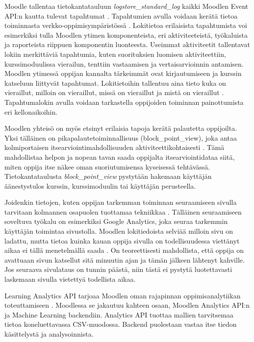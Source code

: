 Moodle tallentaa tietokantatauluun \emph{logstore\_standard\_log} kaikki Moodlen Event API:n kautta tulevat tapahtumat \citep{dougiamasMoodle2022, dougiamasLoggingMoodleDocs2021}. Tapahtumien avulla voidaan kerätä tietoa toiminnasta verkko-oppimisympäristössä \citep{agudo-peregrinaCanWePredict2014}. Lokitietoa erilaisista tapahtumista voi esimerkiksi tulla Moodlen ytimen komponenteista, eri aktiviteeteistä, työkaluista ja raporteista riippuen komponentin luonteesta. Useimmat aktiviteetit tallentavat lokiin merkittäviä tapahtumia, kuten suorituksien luomisen aktiviteettiin, kurssimoduulissa vierailun, tenttiin vastaamisen ja vertaisarvioinnin antamisen. Moodlen ytimessä oppijan kannalta tärkeimmät ovat kirjautumiseen ja kurssin katseluun liittyvät tapahtumat. Lokitietoihin tallentuu aina tieto kuka on vieraillut, milloin on vieraillut, missä on vieraillut ja mistä on vieraillut \citep{abdullahLearningStyleClassification2015}. Tapahtumalokin avulla voidaan tarkastella oppijoiden toiminnan painottumista eri kellonaikoihin.

Moodlen yhteisö on myös etsinyt erilaisia tapoja kerätä palautetta oppijoilta. Yksi tälläinen on pikapalautetoiminnallisuus (block\_point\_view), joka antaa kolmiportaisen itsearviointimahdollisuuden aktiviteettikohtaisesti \citep{fombaronMoodlePluginPoint2021}. Tämä mahdollistaa helpon ja nopean tavan saada oppijalta itsearviointidataa siitä, miten oppija itse näkee oman suoriutumisensa kyseisessä tehtävässä. Tietokantataulusta \emph{block\_point\_view} pystytään hakemaan käyttäjän äänestystulos kurssin, kurssimoduulin tai käyttäjän perusteella.

Joidenkin tietojen, kuten oppijan tarkemman toiminnan seuraamiseen sivulla tarvitaan kolmannen osapuolen tuottamaa tekniikkaa \citep{filvaGoogleAnalyticsTime2014}. Tälläinen seuraamiseen soveltuva työkalu on esimerkiksi Google Analytics, joka seuraa tarkemmin käyttäjän toimintaa sivustolla. Moodlen lokitiedoista selviää milloin sivu on ladattu, mutta tietoa kuinka kauan oppija sivulla on todellisuudessa viettänyt aikaa ei tällä menetelmällä saada \citep{dougiamasMoodle2022}. On teoreettisesti mahdollista, että oppija on avattuaan sivun katsellut sitä minuutin ajan ja tämän jälkeen lähtenyt kahville. Jos seuraava sivulataus on tunnin päästä, niin tästä ei pystytä luotettavasti laskemaan sivulla vietettyä todellista aikaa.

\color{blue}
Learning Analytics API tarjoaa Moodlen oman rajapinnan oppimisanalytiikan toteuttamiseen \citep{oliveSupervisedLearningFramework2018}. Moodlessa se jakautuu kahteen osaan, Moodlen Analytics API:n ja Machine Learning backendiin. Analytics API tuottaa mallien tarvitsemaa tietoa koneluettavassa CSV-muodossa. Backend puolestaan vastaa itse tiedon käsittelystä ja analysoinnista.
\color{black}

